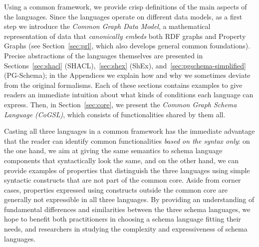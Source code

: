 Using a common framework, we provide crisp definitions of the main aspects of
the languages.
Since the languages operate on different data models, as a first step we
introduce the \emph{Common Graph Data Model}, a mathematical representation of
data that \emph{canonically embeds} both RDF graphs and Property Graphs (see
Section~\ref{sec:prl}, which also develops general common foundations).
Precise abstractions of the languages themselves are presented in
Sections~\ref{sec:shacl} (SHACL),~\ref{sec:shex} (ShEx),
and~\ref{sec:pgschema-simplified} (PG-Schema);
in the Appendices we explain how and why we sometimes deviate from the original
formalisms.
Each of these sections contains examples to give readers an immediate intuition
about what kinds of conditions each language can express.
Then, in Section~\ref{sec:core}, we present the \emph{Common Graph Schema
Language (CoGSL)}, which consists of functionalities shared by them all.

Casting all three languages in a common framework has the immediate advantage
that the reader can identify common functionalities \emph{based on the syntax
only}: on the one hand, we aim at giving the same semantics to schema language
components that syntactically look the same, and on the other hand, we can
provide examples of properties that distinguish the three languages using simple
syntactic constructs that are not part of the common core.
Aside from corner cases, properties expressed using constructs outside the
common core are generally not expressible in all three languages.
By providing an understanding of fundamental differences and similarities
between the three schema languages, we hope to benefit both practitioners in
choosing a schema language fitting their needs, and researchers in studying the
complexity and expressiveness of schema languages.

